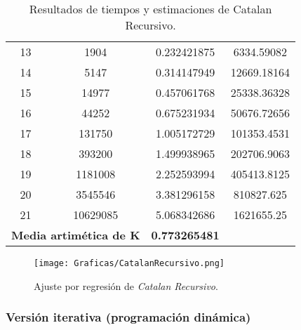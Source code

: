 \documentclass[a4paper,12pt]{article} %
\begin{document}
\begin{table}[H]
{\begin{tabular}{|c|c|c|c|}
			13                                                 & 1904                 & 0.232421875              & 6334.59082                                           \\
			14                                                 & 5147                 & 0.314147949              & 12669.18164                                          \\
			15                                                 & 14977                & 0.457061768              & 25338.36328                                          \\
			16                                                 & 44252                & 0.675231934              & 50676.72656                                          \\
			17                                                 & 131750               & 1.005172729              & 101353.4531                                          \\
			18                                                 & 393200               & 1.499938965              & 202706.9063                                          \\
			19                                                 & 1181008              & 2.252593994              & 405413.8125                                          \\
			20                                                 & 3545546              & 3.381296158              & 810827.625                                           \\
			21                                                 & 10629085             & 5.068342686              & 1621655.25                                           \\
			\hline
			\multicolumn{2}{l}{\textbf{Media artimética de K}} & \textbf{0.773265481}                                                                                   \\
			\hline
		\end{tabular}
	}
	\caption{Resultados de tiempos y estimaciones de Catalan Recursivo.}
	\label{tab:tiempos}
\end{table}


\begin{figure}[H]
	\centering
	\texttt{[image: Graficas/CatalanRecursivo.png]}
	\caption{Ajuste por regresión de \textit{Catalan Recursivo}.}
\end{figure}

\subsubsection{Versión iterativa (programación dinámica)}
\end{document}
